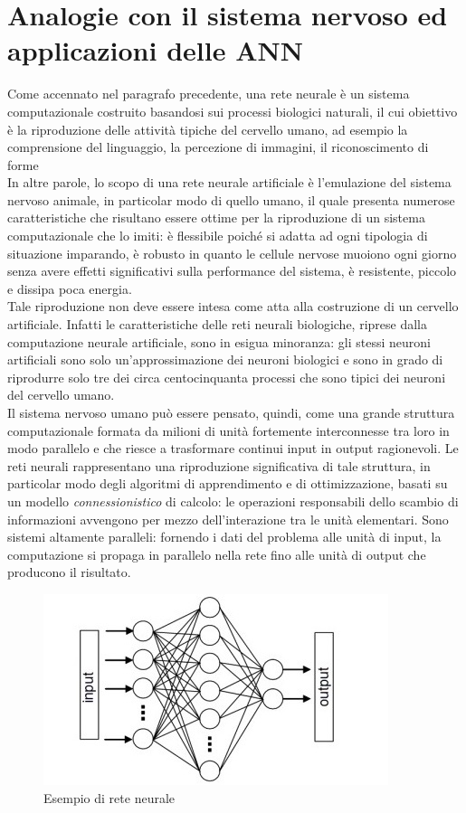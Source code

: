 \documentclass[12pt,a4paper,oneside]{book}
\begin{document}
		
		
		
	\section{Analogie con il sistema nervoso ed applicazioni delle ANN}
	
		Come accennato nel paragrafo precedente, una rete neurale è un sistema computazionale costruito basandosi sui processi biologici naturali, il cui obiettivo è la riproduzione delle attività tipiche del cervello umano, ad esempio la comprensione del linguaggio, la percezione di immagini, il riconoscimento di forme  \\
		In altre parole, lo scopo di una rete neurale artificiale è l’emulazione del sistema nervoso animale, in particolar modo di quello umano, il quale presenta numerose caratteristiche che risultano essere ottime per la riproduzione di un sistema computazionale che lo imiti: è flessibile poiché si adatta ad ogni tipologia di situazione imparando, è robusto in quanto le cellule nervose muoiono ogni giorno senza avere effetti significativi sulla performance del sistema, è resistente, piccolo e dissipa poca energia. \\
		Tale riproduzione non deve essere intesa come atta alla costruzione di un cervello artificiale. Infatti le caratteristiche delle reti neurali biologiche, riprese dalla computazione neurale artificiale, sono in esigua minoranza: gli stessi neuroni artificiali sono solo un’approssimazione dei neuroni biologici e sono in grado di riprodurre solo tre dei circa centocinquanta processi che sono tipici dei neuroni del cervello umano.\\
		Il sistema nervoso umano può essere pensato, quindi, come una grande struttura computazionale formata da milioni di unità fortemente interconnesse tra loro in modo parallelo e che riesce a trasformare continui input in output ragionevoli. Le reti neurali rappresentano una riproduzione significativa di tale struttura, in particolar modo degli algoritmi di apprendimento e di ottimizzazione, basati su un modello \emph{connessionistico} di calcolo: le operazioni responsabili dello scambio di informazioni avvengono per mezzo dell'interazione tra le unità elementari. Sono sistemi altamente paralleli: fornendo i dati del problema alle unità di input, la computazione si propaga in parallelo nella rete fino alle unità di output che producono il risultato. \\
	
		\begin{figure}[h]
			\centering
			\includegraphics[width=0.6\linewidth]{IMMAGINI/esempioiniziale}
			\caption{Esempio di rete neurale}
			\label{fig:esempio}
		\end{figure}
		
\end{document}

